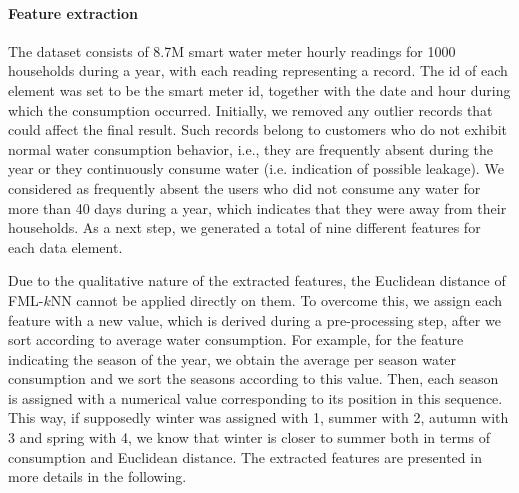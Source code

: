 \paragraph{Feature extraction}
\label{par:feat_extr1}
The dataset consists of 8.7M smart water meter hourly readings for 1000 households during a year, with each reading representing a record. The id of each element was set to be the smart meter id, together with the date and hour during which the consumption occurred. Initially, we removed any outlier records that could affect the final result. Such records belong to customers who do not exhibit normal water consumption behavior, i.e., they are frequently absent during the year or they continuously consume water (i.e. indication of possible leakage). We considered as frequently absent the users who did not consume any water for more than 40 days during a year, which indicates that they were away from their households. As a next step, we generated a total of nine different features for each data element. 

Due to the qualitative nature of the extracted features, the Euclidean distance of FML-$k$NN cannot be applied directly on them. To overcome this, we assign each feature with a new value, which is derived during a pre-processing step, after we sort according to average water consumption. For example, for the feature indicating the season of the year, we obtain the average per season water consumption and we sort the seasons according to this value. Then, each season is assigned with a numerical value corresponding to its position in this sequence. This way, if supposedly winter was assigned with 1, summer with 2, autumn with 3 and spring with 4, we know that winter is closer to summer both in terms of consumption and Euclidean distance. The extracted features are presented in more details in the following.

